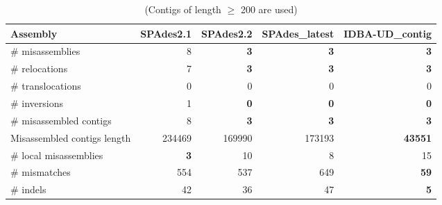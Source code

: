 \documentclass[12pt,a4paper]{article}
\begin{document}
\begin{table}[ht]
\begin{center}
\caption{(Contigs of length $\geq$ 200 are used)}
\begin{tabular}{|l*{4}{|r}|}
\hline
Assembly & SPAdes2.1 & SPAdes2.2 & SPAdes\_latest & IDBA-UD\_contig \\ \hline
\# misassemblies & 8 & {\bf 3} & {\bf 3} & {\bf 3} \\ \hline
    \# relocations & 7 & {\bf 3} & {\bf 3} & {\bf 3} \\ \hline
    \# translocations & 0 & 0 & 0 & 0 \\ \hline
    \# inversions & 1 & {\bf 0} & {\bf 0} & {\bf 0} \\ \hline
\# misassembled contigs & 8 & {\bf 3} & {\bf 3} & {\bf 3} \\ \hline
Misassembled contigs length & 234469 & 169990 & 173193 & {\bf 43551} \\ \hline
\# local misassemblies & {\bf 3} & 10 & 8 & 15 \\ \hline
\# mismatches & 554 & 537 & 649 & {\bf 59} \\ \hline
\# indels & 42 & 36 & 47 & {\bf 5} \\ \hline
\end{tabular}
\end{center}
\end{table}
\end{document}
